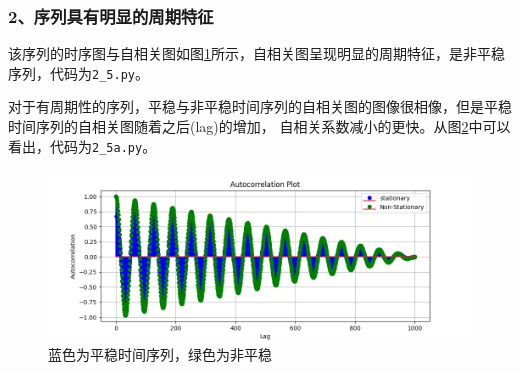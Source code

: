 \documentclass[12pt, a4paper, oneside]{ctexbook}
\begin{document}
\subsubsection{2、序列具有明显的周期特征}
该序列的时序图与自相关图如图\ref{im2_5}所示，自相关图呈现明显的周期特征，是非平稳序列，代码为\texttt{2\_5.py}。

\begin{figure}[hp]
    \centering
    \hfill
    \caption{}
    \label{im2_5}
\end{figure}

对于有周期性的序列，平稳与非平稳时间序列的自相关图的图像很相像，但是平稳时间序列的自相关图随着之后(lag)的增加，
自相关系数减小的更快。从图\ref{im2_5a}中可以看出，代码为\texttt{2\_5a.py}。

\begin{figure}[hp]
    \centering
    \includegraphics[scale = 0.6]{img/2_5a.png}
    \caption{蓝色为平稳时间序列，绿色为非平稳}
    \label{im2_5a}
\end{figure}
\end{document}
